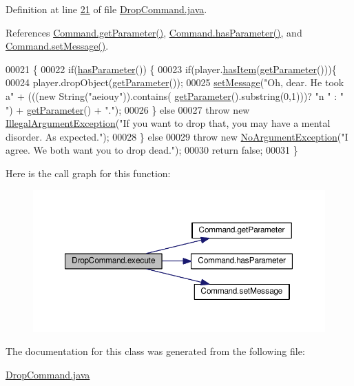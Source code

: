Definition at line \hyperlink{DropCommand_8java_source_l00021}{21} of file \hyperlink{DropCommand_8java_source}{Drop\-Command.\-java}.



References \hyperlink{Command_8java_source_l00025}{Command.\-get\-Parameter()}, \hyperlink{Command_8java_source_l00041}{Command.\-has\-Parameter()}, and \hyperlink{Command_8java_source_l00049}{Command.\-set\-Message()}.


\begin{DoxyCode}
00021                                                                                               \{
00022         \textcolor{keywordflow}{if}(\hyperlink{classCommand_a9b042558156d6749566e0fd9d48d3bfe}{hasParameter}()) \{
00023             \textcolor{keywordflow}{if}(player.\hyperlink{classPlayer_a90cb3f05b491eaed668fe54b9258b755}{hasItem}(\hyperlink{classCommand_a1ced3739d546770ba1389e6ce228255e}{getParameter}()))\{
00024                 player.dropObject(\hyperlink{classCommand_a1ced3739d546770ba1389e6ce228255e}{getParameter}());
00025                 \hyperlink{classCommand_a715709d8f0ab65879d79ad1725c96f17}{setMessage}(\textcolor{stringliteral}{"Oh, dear. He took a"} + (((\textcolor{keyword}{new} String(\textcolor{stringliteral}{"aeiouy"})).contains(
      \hyperlink{classCommand_a1ced3739d546770ba1389e6ce228255e}{getParameter}().substring(0,1)))? \textcolor{stringliteral}{"n "} : \textcolor{stringliteral}{" "}) + \hyperlink{classCommand_a1ced3739d546770ba1389e6ce228255e}{getParameter}() + \textcolor{stringliteral}{"."});
00026             \} \textcolor{keywordflow}{else}
00027                 \textcolor{keywordflow}{throw} \textcolor{keyword}{new} \hyperlink{classIllegalArgumentException}{IllegalArgumentException}(\textcolor{stringliteral}{"If you want to drop that, you
       may have a mental disorder. As expected."});
00028         \} \textcolor{keywordflow}{else}
00029             \textcolor{keywordflow}{throw} \textcolor{keyword}{new} \hyperlink{classNoArgumentException}{NoArgumentException}(\textcolor{stringliteral}{"I agree. We both want you to drop dead."});
00030         \textcolor{keywordflow}{return} \textcolor{keyword}{false};
00031     \}
\end{DoxyCode}


Here is the call graph for this function\-:
\nopagebreak
\begin{figure}[H]
\begin{center}
\leavevmode
\includegraphics[width=350pt]{classDropCommand_a52432de0841ff8eb85d4f115965aecd1_cgraph}
\end{center}
\end{figure}




The documentation for this class was generated from the following file\-:\begin{DoxyCompactItemize}
\item 
\hyperlink{DropCommand_8java}{Drop\-Command.\-java}\end{DoxyCompactItemize}
